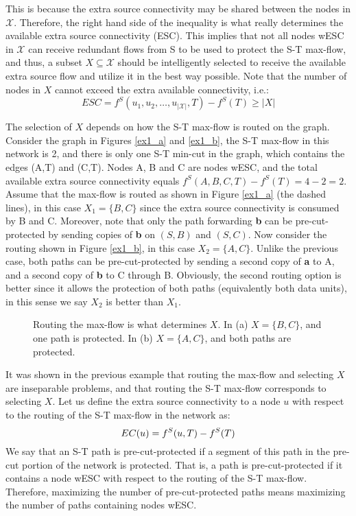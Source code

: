 \documentclass[conference]{IEEEtran}
\newcommand{\mc}[1]{\mathcal{#1}}
\begin{document}
This is because the extra source connectivity may be shared between the nodes in $\mc{X}$. Therefore, the right hand side of the inequality is what really determines the available extra source connectivity (ESC). This implies that not all nodes wESC in $\mc{X}$ can receive redundant flows from S to be used to protect the S-T max-flow, and thus, a subset $X \subseteq \mc{X}$ should be intelligently selected to receive the available extra source flow and utilize it in the best way possible. Note that the number of nodes in $X$ cannot exceed the extra available connectivity, i.e.:
\begin{equation}
\label{equ:ESC}
ESC = f^S(u_1, u_2, \dots, u_{|\mc{X}|}, T) - f^S(T) \geq |X|
\end{equation}

The selection of $X$ depends on how the S-T max-flow is routed on the graph. Consider the graph in Figures \ref{ex1_a} and \ref{ex1_b}, the S-T max-flow in this network is 2, and there is only one S-T min-cut in the graph, which contains the edges (A,T) and (C,T). Nodes A, B and C are nodes wESC, and the total available extra source connectivity equals $f^S(A,B,C,T) - f^S(T) = 4 - 2 = 2$. Assume that the max-flow is routed as shown in Figure \ref{ex1_a} (the dashed lines), in this case $X_1=\{B,C\}$ since the extra source connectivity is consumed by B and C. Moreover, note that only the path forwarding \textbf{b} can be pre-cut-protected by sending copies of \textbf{b} on $(S,B)$ and $(S,C)$. Now consider the routing shown in Figure \ref{ex1_b}, in this case $X_2=\{A,C\}$. Unlike the previous case, both paths can be pre-cut-protected by sending a second copy of \textbf{a} to A, and a second copy of \textbf{b} to C through B. Obviously, the second routing option is better since it allows the protection of both paths (equivalently both data units), in this sense we say $X_2$ is better than $X_1$. 


\begin{figure}[htp]
\begin{center}
\hspace{1cm}
\end{center}
\caption{Routing the max-flow is what determines $X$. In (a) $X=\{B,C\}$, and one path is protected. In (b) $X=\{A,C\}$, and both paths are protected.}
\label{fig:ex1}
\end{figure}

It was shown in the previous example that routing the max-flow and selecting $X$ are inseparable problems, and that routing the S-T max-flow corresponds to selecting $X$. Let us define the extra source connectivity to a node $u$ with respect to the routing of the S-T max-flow in the network as:\[\footnotesize EC(u) = f^S(u,T) - f^S(T)\] We say that an S-T path is pre-cut-protected if a segment of this path in the pre-cut portion of the network is protected. That is, a path is pre-cut-protected if it contains a node wESC with respect to the routing of the S-T max-flow. Therefore, maximizing the number of pre-cut-protected paths means maximizing the number of paths containing nodes wESC. 
\end{document}
